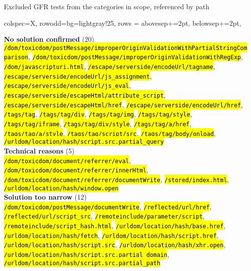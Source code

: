 \newcommand{\myarrow}{\textcolor{red}{$\hookrightarrow$}}
\soulregister{\myarrow}{1}
\newcommand\gfrpath[1]{\hl{\texttt{#1}}}  %

\begin{table}[htb]
	\centering
	\tablesize
    \caption{Excluded GFR tests from the categories in scope, referenced by path}\label{tab:appendix:gfr-excluded-tests}%
    \begin{booktabs}{
        colspec={X},
        row{odd}={bg=lightgray!25},
        rows = {abovesep+=2pt, belowsep+=2pt},
    }
    \toprule
    
    \textbf{No solution confirmed} (20) \\ 
    \gfrpath{/dom/toxicdom/postMessage/improperOriginValidationWithPartialStringComparison}, \gfrpath{/dom/toxicdom/postMessage/improperOriginValidationWithRegExp}, \gfrpath{/dom/javascripturi.html}, \gfrpath{/escape/serverside/encodeUrl/tagname}, \gfrpath{/escape/serverside/encodeUrl/js\_assignment}, \gfrpath{/escape/serverside/encodeUrl/js\_eval}, \gfrpath{/escape/serverside/escapeHtml/attribute\_script}, \gfrpath{/escape/serverside/escapeHtml/href}, \gfrpath{/escape/serverside/encodeUrl/href}, \gfrpath{/tags/tag}, \gfrpath{/tags/tag/div}, \gfrpath{/tags/tag/img}, \gfrpath{/tags/tag/style}, \gfrpath{/tags/tag/iframe}, \gfrpath{/tags/tag/div/style}, \gfrpath{/tags/tag/a/href}, \gfrpath{/tags/tag/a/style}, \gfrpath{/tags/tag/script/src}, \gfrpath{/tags/tag/body/onload}, \gfrpath{/urldom/location/hash/script.src.partial\_query} \\
    
    \textbf{Technical reasons} (5) \\ 
    \gfrpath{/dom/toxicdom/document/referrer/eval}, \gfrpath{/dom/toxicdom/document/referrer/innerHtml}, \gfrpath{/dom/toxicdom/document/referrer/documentWrite}, \gfrpath{/stored/index.html}, \gfrpath{/urldom/location/hash/window.open} \\
    
    \textbf{Solution too narrow} (12) \\ 
    \gfrpath{/dom/toxicdom/postMessage/documentWrite}, \gfrpath{/reflected/url/href}, \gfrpath{/reflected/url/script\_src}, \gfrpath{/remoteinclude/parameter/script}, \gfrpath{/remoteinclude/script\_hash.html}, \gfrpath{/urldom/location/hash/base.href}, \gfrpath{/urldom/location/hash/fetch}, \gfrpath{/urldom/location/hash/script.href}, \gfrpath{/urldom/location/hash/script.src}, \gfrpath{/urldom/location/hash/xhr.open}, \gfrpath{/urldom/location/hash/script.src.partial\_domain}, \gfrpath{/urldom/location/hash/script.src.partial\_path} \\
    

\end{booktabs}
\end{table}
